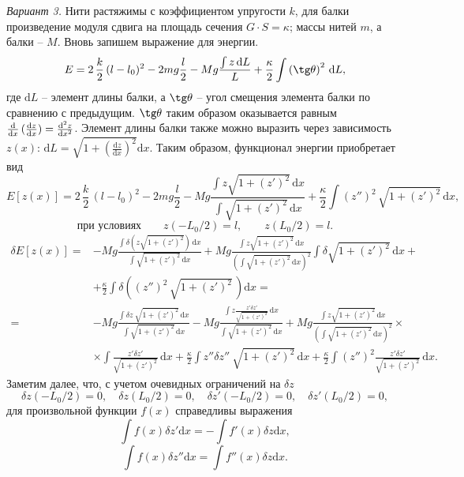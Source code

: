 \documentclass[a4paper, 12pt]{article}
\def\d{\mathrm{d}}
\begin{document}
\textit{Вариант 3.} Нити растяжимы с коэффициентом упругости $k$, для 
балки произведение модуля сдвига на площадь сечения $G \cdot 
S = \kappa$; массы нитей $m$, а балки -- $M$. Вновь запишем выражение 
для энергии.
$$ E = 2\,\frac{k}{2}\,(l - l_0)^2 - 2mg\frac{l}{2} - Mg \frac{\int z\,\mathrm{d} L}{L} + \frac{\kappa}{2} \int \left(\tg\theta\right)^2\,\mathrm{d} L, $$
где $\mathrm{d}L$ -- элемент длины балки, а $\tg\theta$ -- угол смещения 
элемента балки по сравнению с предыдущим. $\tg\theta$ таким образом 
оказывается равным ${\mathrm{d}\over\mathrm{d}x} \, ({\mathrm{d} z \over 
\mathrm{d} x}) = \frac{\mathrm{d}^2 z}{\mathrm{d} x ^2}$. Элемент длины 
балки также можно выразить через зависимость $z(x)$: $\mathrm{d}L 
= \sqrt{1 + \left(\frac{\mathrm{d} z}{\mathrm{d} x}\right)^2} \mathrm{d} 
x$. Таким образом, функционал энергии приобретает вид
$$ E[z(x)] = 2\,\frac{k}{2}\,(l - l_0)^2 - 2mg\frac{l}{2} - Mg \frac{\int z\sqrt{1 + (z')^2}\,\mathrm{d} x}{\int \sqrt{1 + (z')^2}\,\mathrm{d} x} + \frac{\kappa}{2} \int (z'')^2\,\sqrt{1 + (z')^2}\,\mathrm{d} x, $$
$$ \text{при условиях} \qquad z(-L_0/2) = l, \qquad z(L_0/2) = l. $$
$$\begin{aligned}
	\delta E[z(x)]
	=& - Mg \frac{\int \delta \left(z\sqrt{1 + (z')^2}\right)\,\mathrm{d} x}{\int \sqrt{1 + (z')^2}\,\mathrm{d} x} + Mg \frac{\int z\sqrt{1 + (z')^2}\,\mathrm{d} x}{\left(\int \sqrt{1 + (z')^2}\,\mathrm{d} x\right)^2} \int \delta \sqrt{1 + (z')^2}\,\mathrm{d} x +\\
	&+ \frac{\kappa}{2} \int \delta \left((z'')^2\,\sqrt{1 + (z')^2}\,\right) \mathrm{d} x = \\
	=& - Mg \frac{\int \delta z\ \sqrt{1 + (z')^2}\,\mathrm{d} x}{\int \sqrt{1 + (z')^2}\,\mathrm{d} x}
	- Mg \frac{\int z \frac{z'\delta z'}{\sqrt{1 + (z')^2}}\,\mathrm{d} x}{\int \sqrt{1 + (z')^2}\,\mathrm{d} x} + Mg \frac{\int z\sqrt{1 + (z')^2}\,\mathrm{d} x}{\left(\int \sqrt{1 + (z')^2}\,\mathrm{d} x\right)^2} \times \\
	&\times \int \frac{z'\delta z'}{\sqrt{1 + (z')^2}}\,\mathrm{d} x + \frac{\kappa}{2} \int z'' \delta z''\ \sqrt{1 + (z')^2}\,\mathrm{d} x + \frac{\kappa}{2} \int (z'')^2 \frac{z'\delta z'}{\sqrt{1 + (z')^2}}\,\mathrm{d} x.
\end{aligned}$$
Заметим далее, что, с учетом очевидных ограничений на $\delta z$
$$
\delta z(-L_0/2) = 0
,\quad
\delta z(L_0/2) = 0
,\quad
\delta z'(-L_0/2) = 0
,\quad
\delta z'(L_0/2) = 0
,$$ 
для произвольной функции $f(x)$ справедливы выражения
$$ \int f(x) \delta z' \d x = -\int f'(x) \delta z \d x,$$
$$ \int f(x) \delta z'' \d x = \int f''(x) \delta z \d x.$$
\end{document}
